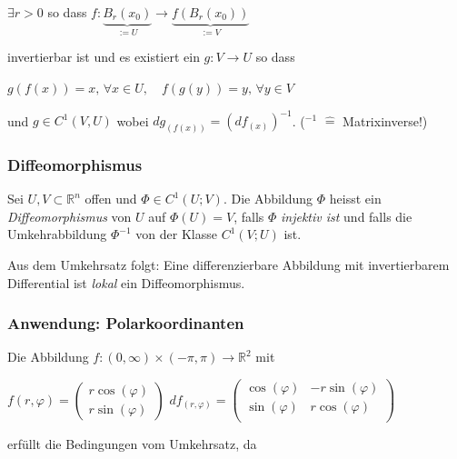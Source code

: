 \documentclass[a4paper, fontsize = 8pt, landscape]{scrartcl}
\newcommand{\R}[0]{\mathbb{R}}
\begin{document}
\begin{multicols*}{3}
    \begin{center}
        $\exists r > 0$ so dass $f:\underbrace{B_r(x_0)}_{:= U} \to \underbrace{f(B_r(x_0))}_{:=V}$
    \end{center}

    invertierbar ist und es existiert ein $g: V \to U$ so dass

    \begin{center}
        $g(f(x)) = x, \, \forall x \in U, \quad f(g(y)) = y, \, \forall y \in V$
    \end{center}


    und $g \in C^1(V, U)$ wobei $dg_{(f(x))} = (df_{(x)})^{-1}$. ($^{-1}$ $\hat{=}$ Matrixinverse!)


    \subsubsection{Diffeomorphismus}

    Sei $U,V \subset \R^n$ offen und $\Phi \in C^1(U;V)$. Die Abbildung $\Phi$ heisst ein \emph{Diffeomorphismus} von $U$ auf $\Phi(U) = V$, falls $\Phi$ \emph{injektiv ist} und falls die Umkehrabbildung $\Phi^{-1}$ von der Klasse $C^1(V;U)$ ist. \medskip

    Aus dem Umkehrsatz folgt: Eine differenzierbare Abbildung mit invertierbarem Differential ist \emph{lokal} ein Diffeomorphismus.


    \subsubsection{Anwendung: Polarkoordinanten}

    Die Abbildung $f: (0, \infty) \times (-\pi,\pi)  \to \R^2$ mit

    \begin{center}
        $f(r, \varphi) = \begin{pmatrix}
                r \cos(\varphi) \\ r \sin(\varphi)
            \end{pmatrix}$ \qquad $df_{(r, \varphi)} = \begin{pmatrix}
                \cos(\varphi) & - r \sin(\varphi) \\ \sin(\varphi) & r \cos(\varphi) \\
            \end{pmatrix}$
    \end{center}

    erfüllt die Bedingungen vom Umkehrsatz, da


\end{multicols*}
\end{document}
